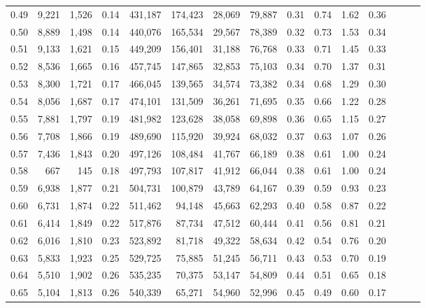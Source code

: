\begin{tabular}{rrrrrrrrrrrrrrr}
0.49 &   9,221 &  1,526 &  0.14 &  431,187 &  174,423 &   28,069 &   79,887 &  0.31 &  0.74 &  1.62 &      0.36 \\
0.50 &   8,889 &  1,498 &  0.14 &  440,076 &  165,534 &   29,567 &   78,389 &  0.32 &  0.73 &  1.53 &      0.34 \\
0.51 &   9,133 &  1,621 &  0.15 &  449,209 &  156,401 &   31,188 &   76,768 &  0.33 &  0.71 &  1.45 &      0.33 \\
0.52 &   8,536 &  1,665 &  0.16 &  457,745 &  147,865 &   32,853 &   75,103 &  0.34 &  0.70 &  1.37 &      0.31 \\
0.53 &   8,300 &  1,721 &  0.17 &  466,045 &  139,565 &   34,574 &   73,382 &  0.34 &  0.68 &  1.29 &      0.30 \\
0.54 &   8,056 &  1,687 &  0.17 &  474,101 &  131,509 &   36,261 &   71,695 &  0.35 &  0.66 &  1.22 &      0.28 \\
0.55 &   7,881 &  1,797 &  0.19 &  481,982 &  123,628 &   38,058 &   69,898 &  0.36 &  0.65 &  1.15 &      0.27 \\
0.56 &   7,708 &  1,866 &  0.19 &  489,690 &  115,920 &   39,924 &   68,032 &  0.37 &  0.63 &  1.07 &      0.26 \\
0.57 &   7,436 &  1,843 &  0.20 &  497,126 &  108,484 &   41,767 &   66,189 &  0.38 &  0.61 &  1.00 &      0.24 \\
0.58 &     667 &    145 &  0.18 &  497,793 &  107,817 &   41,912 &   66,044 &  0.38 &  0.61 &  1.00 &      0.24 \\
0.59 &   6,938 &  1,877 &  0.21 &  504,731 &  100,879 &   43,789 &   64,167 &  0.39 &  0.59 &  0.93 &      0.23 \\
0.60 &   6,731 &  1,874 &  0.22 &  511,462 &   94,148 &   45,663 &   62,293 &  0.40 &  0.58 &  0.87 &      0.22 \\
0.61 &   6,414 &  1,849 &  0.22 &  517,876 &   87,734 &   47,512 &   60,444 &  0.41 &  0.56 &  0.81 &      0.21 \\
0.62 &   6,016 &  1,810 &  0.23 &  523,892 &   81,718 &   49,322 &   58,634 &  0.42 &  0.54 &  0.76 &      0.20 \\
0.63 &   5,833 &  1,923 &  0.25 &  529,725 &   75,885 &   51,245 &   56,711 &  0.43 &  0.53 &  0.70 &      0.19 \\
0.64 &   5,510 &  1,902 &  0.26 &  535,235 &   70,375 &   53,147 &   54,809 &  0.44 &  0.51 &  0.65 &      0.18 \\
0.65 &   5,104 &  1,813 &  0.26 &  540,339 &   65,271 &   54,960 &   52,996 &  0.45 &  0.49 &  0.60 &      0.17 \\

\end{tabular}
